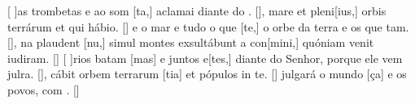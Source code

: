 {    {[ ]{as} trombetas e ao som [ta,] aclamai diante do . [\LinkPT]},
  { mare et pleni[ius,] orbis terrárum et qui hábio. [\LinkLA]}%
    {e o mar e tudo o que [te,] o orbe da terra e os que tam. [\LinkPT]},
  {na plaudent [nu,] simul montes exsultábunt a con[mini,] quóniam venit iudiram. [\LinkLA]}%
    {[ ]{ri}os batam [mas] e juntos e[tes,] diante do Senhor, porque ele vem julra. [\LinkPT]},
  {cábit orbem terrarum [tia] et pópulos in \-te. [\LinkLA]}%
    { julgará o mundo [ça] e os povos, com . [\LinkPT]}
}